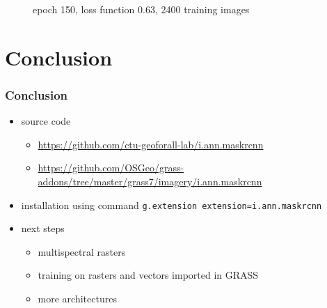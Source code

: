 \documentclass{beamer}
\begin{document}
\begin{frame}
\begin{figure}[ht]
{	\caption{epoch 150, loss function 0.63, 2400 training images}}
\end{figure}

\end{frame}


\section{Conclusion}

\begin{frame}[fragile]

\frametitle{Conclusion}

\begin{itemize}
	\item source code
	\begin{itemize}
		\item \url{https://github.com/ctu-geoforall-lab/i.ann.maskrcnn}
		\item \url{https://github.com/OSGeo/grass-addons/tree/master/grass7/imagery/i.ann.maskrcnn}
	\end{itemize}
	\item installation using command \verb|g.extension extension=i.ann.maskrcnn|
	\item next steps
	\begin{itemize}
		\item multispectral rasters
		\item training on rasters and vectors imported in GRASS
		\item more architectures
	\end{itemize}
\end{itemize}

\end{frame}
\end{document}
